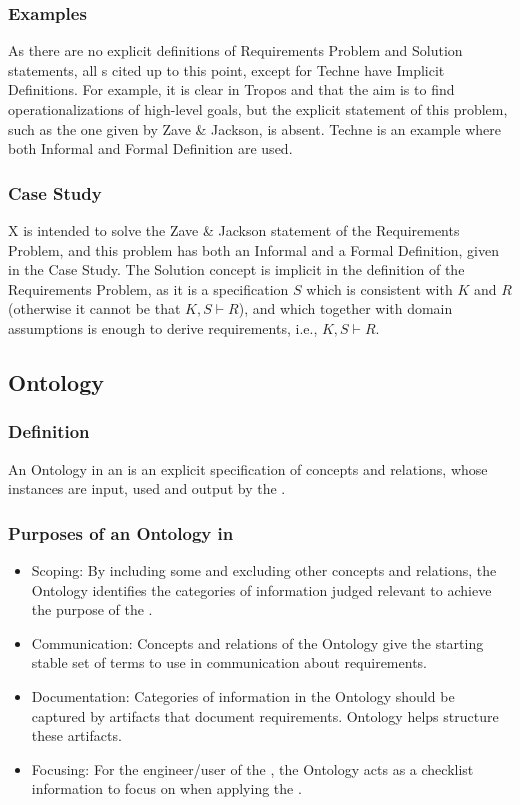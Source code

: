 \documentclass[10pt, final, conference, compsocconf]{IEEEtran}
\begin{document}
\subsubsection{Examples}
As there are no explicit definitions of Requirements Problem and Solution statements, all s cited up to this point, except for Techne have Implicit Definitions. For example, it is clear in Tropos and  that the aim is to find operationalizations of high-level goals, but the explicit statement of this problem, such as the one given by Zave \& Jackson, is absent. Techne is an example where both Informal and Formal Definition are used. 

\subsubsection{Case Study}
X is intended to solve the Zave \& Jackson statement of the Requirements Problem, and this problem has both an Informal and a Formal Definition, given in the Case Study. The Solution concept is implicit in the definition of the Requirements Problem, as it is a specification $S$ which is consistent with $K$ and $R$ (otherwise it cannot be that $K, S \vdash R$), and which together with domain assumptions is enough to derive requirements, i.e., $K, S \vdash R$.


\subsection{Ontology}\label{s:components:ontology}

\subsubsection{Definition} An Ontology in an  is an explicit specification of concepts and relations, whose instances are input, used and output by the .

\subsubsection{Purposes of an Ontology in }
\begin{itemize}
\item{Scoping: By including some and excluding other concepts and relations, the Ontology identifies the categories of information judged relevant to achieve the purpose of the .}
\item{Communication: Concepts and relations of the Ontology give the starting stable set of terms to use in communication about requirements.}
\item{Documentation: Categories of information in the Ontology should be captured by artifacts that document requirements. Ontology helps structure these artifacts.}
\item{Focusing: For the engineer/user of the , the Ontology acts as a checklist information to focus on when applying the .}
\end{itemize}
\end{document}
